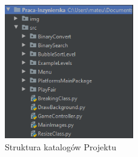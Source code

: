 \documentclass[12pt,a4paper,oneside]{book}
\theoremstyle{definition}
\numberwithin{equation}{chapter}
\begin{document}
\begin{figure}[hpt!]
        \centering
        \includegraphics[width=0.5\textwidth]{ProjectStructure/strukturaAll.png}
        \caption{Struktura katalogów Projektu}
        \label{StrukturaAll}
\end{figure}
\newpage
\end{document}
